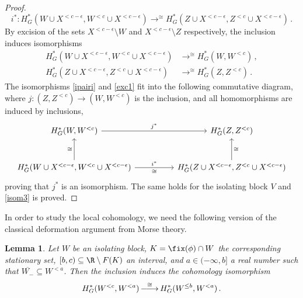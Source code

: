 \documentclass[11pt,a4paper,reqno]{article}
\DeclareMathOperator*{\toup}{\longrightarrow}
\DeclareMathOperator*{\ttoup}{\llongrightarrow}
\DeclareRobustCommand{\llongrightarrow}{\relbar\joinrel\relbar\joinrel\rightarrow}
\numberwithin{equation}{section}
\newtheorem{lemma}[theorem]{Lemma}
\theoremstyle{definition}
\begin{document}
\begin{proof}
\begin{equation}
\label{ipairi}
i^*:
H_G^*(W\cup X^{<c-\epsilon},W^{<c}\cup X^{<c-\epsilon})
\toup^{\cong}
H_G^*(Z\cup X^{<c-\epsilon},Z^{<c}\cup X^{<c-\epsilon}) \, .
\end{equation}
By excision of 
the sets $ X^{<c-\epsilon} \setminus W $ and $  X^{<c-\epsilon} \setminus Z $ respectively,  the inclusion induces isomorphisms
\begin{equation}
\label{exc1}
\begin{aligned}
H_G^*(W\cup X^{<c-\epsilon},W^{<c}\cup X^{<c-\epsilon})
&\toup^{\cong}
H^*_G(W,W^{<c}) \, ,
\\
H_G^*(Z\cup X^{<c-\epsilon},Z^{<c}\cup X^{<c-\epsilon})
&\toup^{\cong}
H^*_G(Z,Z^{<c}) \, .
\end{aligned}
\end{equation}
The isomorphisms 
\eqref{ipairi} and \eqref{exc1} fit into the following commutative diagram, where 
$ j : (Z,Z^{<c}) \to (W,W^{<c})$ is the inclusion,  
and all homomorphisms are induced by inclusions, 
\begin{equation*}
\begin{tikzcd}[row sep=large]
H^*_G(W,W^{<c})
\arrow[rr,"j^*"] 
& &
H^*_G(Z,Z^{<c})
\\
H_G^*(W\cup X^{<c-\epsilon},W^{<c}\cup X^{<c-\epsilon})
\arrow[rr,"i^*","\cong"'] 
\arrow[u,"\cong"] 
& &
H_G^*(Z\cup X^{<c-\epsilon},Z^{<c}\cup X^{<c-\epsilon})
\arrow[u,"\cong"'] 
\end{tikzcd}
\end{equation*}
proving  that $j^*$ is an isomorphism. The same holds for the isolating block $ V $ and 
\eqref{isom3} is proved. 
\end{proof}

In order to study the local cohomology, we  need the following version of the classical deformation argument from Morse theory.

\begin{lemma}
\label{l:deformation}
Let $W$ be an isolating block, $K=\fix(\phi)\cap W$ the corresponding stationary set, $[b,c)\subseteq\R\setminus F(K)$ an interval, and $a\in(-\infty,b]$ a real number such that $\overline{W_-}\subseteq W^{<a}$. Then the  inclusion induces the cohomology isomorphism
\begin{equation}
\label{lemdef2}
    H^*_G(W^{<c},W^{<a})
    \ttoup^{\cong}
    H^*_G(W^{\leq b},W^{<a}) \, .
\end{equation}
\end{lemma}
\end{document}
